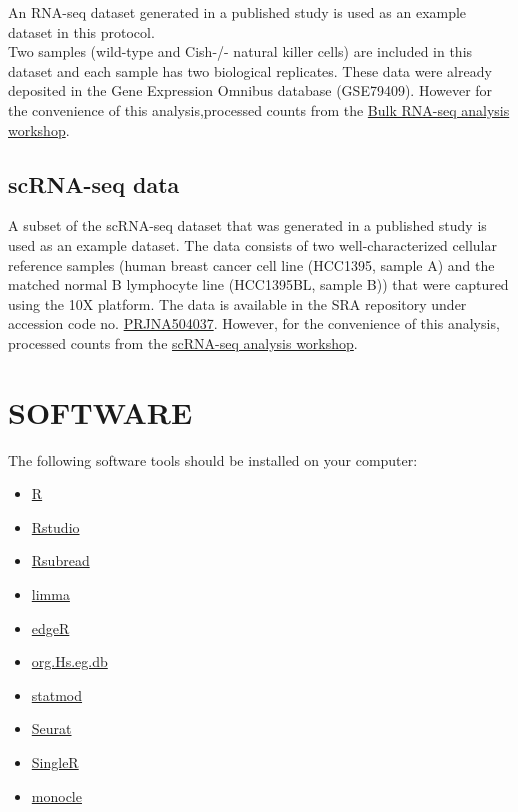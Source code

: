 \documentclass[
  openany]{book}
\providecommand{\tightlist}{%
  \setlength{\itemsep}{0pt}\setlength{\parskip}{0pt}}
\begin{document}
An RNA-seq dataset generated in a published study \citep{delconte2016cis} is used as an example dataset in this protocol.\\

Two samples (wild-type and Cish-/- natural killer cells) are included in this dataset and each sample has two biological replicates. These data were already deposited in the Gene Expression Omnibus database (GSE79409). However for the convenience of this analysis,processed counts from the \href{https://chisangad.github.io/bulkRNAseqtut/index.html}{Bulk RNA-seq analysis workshop}.

\hypertarget{scrna-seq-data}{%
\subsection{scRNA-seq data}\label{scrna-seq-data}}

A subset of the scRNA-seq dataset that was generated in a published study \citep{chen2020multicenter} is used as an example dataset. The data consists of two well-characterized cellular reference samples (human breast cancer cell line (HCC1395, sample A) and the matched normal B lymphocyte line (HCC1395BL, sample B)) that were captured using the 10X platform. The data is available in the SRA repository under accession code no. \href{https://www.ncbi.nlm.nih.gov/bioproject/?term=PRJNA504037}{PRJNA504037}. However, for the convenience of this analysis, processed counts from the \href{https://chisangad.github.io/scRNAseqtut/index.html}{scRNA-seq analysis workshop}.

\hypertarget{software}{%
\section{SOFTWARE}\label{software}}

The following software tools should be installed on your computer:

\begin{itemize}
\tightlist
\item
  \href{https://www.r-project.org}{R}
\item
  \href{https://rstudio.com/}{Rstudio}
\item
  \href{http://bioconductor.org/packages/release/bioc/html/Rsubread.html}{Rsubread}
\item
  \href{http://bioconductor.org/packages/release/bioc/html/limma.html}{limma}
\item
  \href{http://bioconductor.org/packages/release/bioc/html/edgeR.html}{edgeR}
\item
  \href{http://bioconductor.org/packages/release/data/annotation/html/org.Hs.eg.db.html}{org.Hs.eg.db}
\item
  \href{https://CRAN.R-project.org/package=statmod}{statmod}
\item
  \href{https://cloud.r-project.org/package=Seurat}{Seurat}
\item
  \href{https://bioconductor.org/packages/release/bioc/html/SingleR.html}{SingleR}
\item
  \href{https://bioconductor.org/packages/release/bioc/html/monocle.html}{monocle}
\end{itemize}
\end{document}
